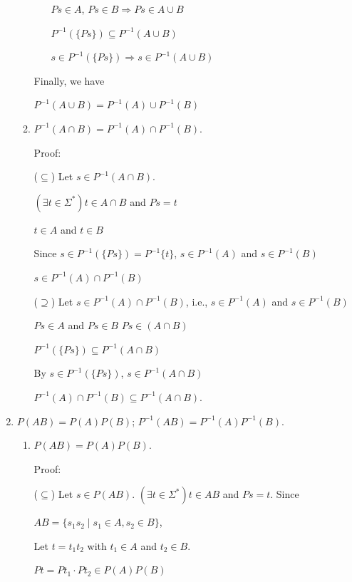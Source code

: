 \documentclass{article}
\begin{document}
\begin{enumerate}
\begin{enumerate}
\begin{itemize}
      $Ps \in A$, $Ps \in B \Rightarrow Ps \in A \cup B$

      $P^{-1}(\{Ps\}) \subseteq P^{-1}(A \cup B)$

      $s \in P^{-1}(\{Ps\}) \Rightarrow s \in P^{-1}(A \cup B)$


    \end{itemize}

    Finally, we have

    $P^{-1}(A \cup B) = P^{-1}(A) \cup P^{-1}(B)$


    
    \item $P^{-1}(A \cap B) = P^{-1}(A) \cap P^{-1}(B)$.
    
    Proof:
    
    ($\subseteq$) Let $s \in P^{-1}(A \cap B)$.

    $(\exists t \in \Sigma^*) t \in A \cap B$ and $Ps = t$

    $t \in A$ and $t \in B$

    Since $s \in P^{-1}(\{Ps\}) = P^{-1}\{t\}$, $s \in P^{-1}(A)$ and $s \in P^{-1}(B)$

    $s \in P^{-1}(A) \cap P^{-1}(B)$

    ($\supseteq$) Let $s \in P^{-1}(A) \cap P^{-1}(B)$, i.e., $s \in P^{-1}(A)$ and $s \in P^{-1}(B)$

    $Ps \in A$ and $Ps \in B$ $Ps \in (A \cap B)$

    $P^{-1}(\{Ps\}) \subseteq P^{-1}(A \cap B)$

    By $s \in P^{-1}(\{Ps\})$, $s \in P^{-1}(A \cap B)$

    $P^{-1}(A) \cap P^{-1}(B) \subseteq P^{-1}(A \cap B)$.



    
  \end{enumerate}  
  \item $P(AB) = P(A)P(B)$; $P^{-1}(AB) = P^{-1}(A)P^{-1}(B)$.

  \begin{enumerate}
    \item $P(AB) = P(A)P(B)$.
    
    Proof:
    
    ($\subseteq$) Let $s \in P(AB)$. $(\exists t \in \Sigma^*) t \in AB$ and $Ps = t$. Since

    $AB = \{s_1s_2 \mid s_1 \in A, s_2 \in B\}$,

    Let $t = t_1t_2$ with $t_1 \in A$ and $t_2 \in B$.

    $Pt = Pt_1 \cdot Pt_2 \in P(A)P(B)$


\end{enumerate}
\end{enumerate}
\end{document}
